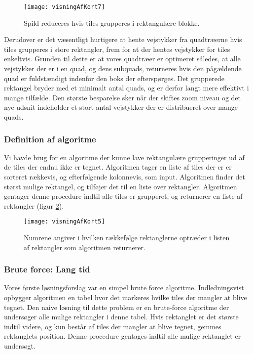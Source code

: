 \begin{figure}[h]
	\centering
	\texttt{[image: visningAfKort7]}
	\captionsetup{width=0.8\textwidth}
	\caption{Spild reduceres hvis tiles grupperes i rektangulære blokke.}
	\label{figur:visningAfKort7}
\end{figure}

Derudover er det væsentligt hurtigere at hente vejstykker fra quadtræerne hvis tiles grupperes i store rektangler, frem for at der hentes vejstykker for tiles enkeltvis. Grunden til dette er at vores quadtræer er optimeret således, at alle vejstykker der er i en quad, og dens subquads, returneres hvis den pågældende quad er fuldstændigt indenfor den boks der efterspørges. Det grupperede rektangel bryder med et minimalt antal quads, og er derfor langt mere effektivt i mange tilfælde. Den største besparelse sker når der skiftes zoom niveau og det nye udsnit indeholder et stort antal vejstykker der er distribueret over mange quads.

\subsubsection{Definition af algoritme}
\label{subsec:definitionAfAlgoritme}

Vi havde brug for en algoritme der kunne lave rektangulære grupperinger ud af de tiles der endnu ikke er tegnet. Algoritmen tager en liste af tiles der er er sorteret rækkevis, og efterfølgende kolonnevis, som input. Algoritmen finder det størst mulige rektangel, og tilføjer det til en liste over rektangler. Algoritmen gentager denne procedure indtil alle tiles er grupperet, og returnerer en liste af rektangler (figur \ref{figur:visningAfKort5}).

\begin{figure}[h]
	\centering
	\texttt{[image: visningAfKort5]}
	\captionsetup{width=0.8\textwidth}
	\caption{Numrene angiver i hvilken rækkefølge rektanglerne optræder i listen af rektangler som algoritmen returnerer.}
	\label{figur:visningAfKort5}
\end{figure}

\subsubsection{Brute force: Lang tid}
\label{subsec:bruteForce}

Vores første løsningsforslag var en simpel brute force algoritme. Indledningsvist opbygger algoritmen en tabel hvor det markeres hvilke tiles der mangler at blive tegnet. Den naive løsning til dette problem er en brute-force algoritme der undersøger alle mulige rektangler i denne tabel. Hvis rektanglet er det største indtil videre, og kun består af tiles der mangler at blive tegnet, gemmes rektanglets position. Denne procedure gentages indtil alle mulige rektanglet er undersøgt.

